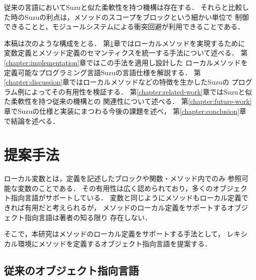\documentclass[a4paper,11pt,dvipdfmx]{jreport}
\begin{document}
従来の言語においてSuzuと似た柔軟性を持つ機構は存在する．
それらと比較した時のSuzuの利点は，メソッドのスコープをブロックという細かい単位で
制御できることと，モジュールシステムによる衝突回避が利用できることである．

本稿は次のような構成をとる．
第\ref{chapter:proposal}章ではローカルメソッドを実現するために
変数定義とメソッド定義のセマンティクスを統一する手法について述べる．
第\ref{chapter:implementation}章ではこの手法を適用し設計した
ローカルメソッドを定義可能なプログラミング言語Suzuの言語仕様を解説する．
第\ref{chapter:discussion}章ではローカルメソッドなどの特徴を生かしたSuzuの
プログラム例によってその有用性を検証する．
第\ref{chapter:related-work}章ではSuzuと似た柔軟性を持つ従来の機構との
関連性について述べる．
第\ref{chapter:future-work}章でSuzuの仕様と実装にまつわる今後の課題を述べ，
第\ref{chapter:conclusion}章で結論を述べる．


\chapter{提案手法}
\label{chapter:proposal}

ローカル変数とは，定義を記述したブロックや関数・メソッド内でのみ
参照可能な変数のことである．
その有用性は広く認められており，多くのオブジェクト指向言語がサポートしている．
変数と同じようにメソッドもローカル定義できれば有用だと考えられるが，
メソッドのローカル定義をサポートするオブジェクト指向言語は著者の知る限り
存在しない．

そこで，本研究はメソッドのローカル定義をサポートする手法として，
レキシカル環境にメソッドを定義するオブジェクト指向言語を提案する．

\section{従来のオブジェクト指向言語}
\end{document}
